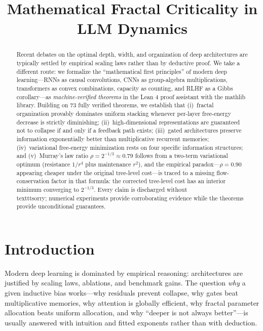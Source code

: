 \documentclass[conference]{IEEEtran}
\begin{document}
\title{Mathematical Fractal Criticality in LLM Dynamics}

\author{}

\maketitle

\begin{abstract}
Recent debates on the optimal depth, width, and organization of deep
architectures are typically settled by empirical scaling laws rather than by
deductive proof. We take a different route: we formalize the ``mathematical
first principles'' of modern deep learning---RNNs as causal convolutions,
CNNs as group-algebra multiplications, transformers as convex combinations,
capacity as counting, and RLHF as a Gibbs corollary---as \emph{machine-verified
theorems} in the Lean 4 proof assistant with the mathlib library. Building on
73 fully verified theorems, we establish that (i)~fractal organization provably
dominates uniform stacking whenever per-layer free-energy decrease is strictly
diminishing; (ii)~high-dimensional representations are guaranteed not to
collapse if and only if a feedback path exists; (iii)~gated architectures
preserve information exponentially better than multiplicative recurrent
memories; (iv)~variational free-energy minimization rests on four specific
information structures; and (v)~Murray's law ratio $\rho=2^{-1/3}\approx0.79$
follows from a two-term variational optimum (resistance $1/r^4$ plus
maintenance $r^2$), and the empirical paradox---$\rho=0.90$ appearing cheaper
under the original tree-level cost---is traced to a missing flow-conservation
factor in that formula: the corrected tree-level cost has an interior minimum
converging to $2^{-1/3}$. Every claim is discharged
without \\texttt{sorry}; numerical experiments provide corroborating evidence
while the theorems provide unconditional guarantees.
\end{abstract}

\section{Introduction}
Modern deep learning is dominated by empirical reasoning: architectures are
justified by scaling laws, ablations, and benchmark gains. The question
\emph{why} a given inductive bias works---why residuals prevent collapse, why
gates beat multiplicative memories, why attention is globally efficient, why
fractal parameter allocation beats uniform allocation, and why ``deeper is not
always better''---is usually answered with intuition and fitted exponents
rather than with deduction.
\end{document}
